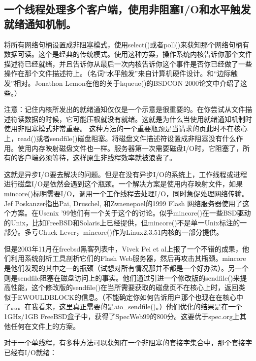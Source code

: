 \documentclass[12pt, twoside, a4paper, xetex]{report}
\begin{document}
\subsection*{一个线程处理多个客户端，使用非阻塞I/O和水平触发就绪通知机制。}

	将所有网络句柄设置成非阻塞模式，使用select()或者poll()来获知那个网络句柄有数据可读。这个是经典的传统模式。使用这种方案，操作系统内核告诉你那个文件描述符已经就绪，并且告诉你从最后一次内核告诉你这个事件是否你已经做了一些操作在那个文件描述符上。（名词“水平触发”来自计算机硬件设计。和“边际触发”相对。Jonathon Lemon在他的关于kqueue()的BSDCON 2000论文中介绍了这些。）
	
	注意：记住内核所发出的就绪通知仅仅是一个示意是很重要的。在你尝试从文件描述符读数据的时候，它可能压根就没有就绪。这就是为什么当使用就绪通知机制时使用非阻塞模式非常重要。
	这种方法的一个重要瓶颈是当请求的页此时不在核心上，read()或者sendfile()磁盘阻塞。将磁盘文件描述符设置成非阻塞没有什么作用。使用内存映射磁盘文件也一样。服务器第一次需要磁盘I/O时，它阻塞了，所有的客户端必须等待，这样原生非线程效率就被浪费了。
	
	这就是异步I/O要去解决的问题。但是在没有异步I/O的系统上，工作线程或进程进行磁盘I/O是依然会遇到这个瓶颈。一个解决方案是使用内存映射文件，如果mincore()标明需要I/O，调用一个工作线程去处理I/O，同时急促处理网络传输。Jef Poskanzer指出Pai, Druschel, 和Zwaenepoel的1999 Flash 网络服务器使用了这个方案。在Usenix '99他们有一个关于这个的讨论。似乎mincore()在一些BSD驱动的Unix，比如FreeBSD和Solaris上已经提供，但mincore()不是单一Unix标注的一部分。多亏Chuck Lever，mincore()作为Linux2.3.51内核的一部分提供。
	
	但是2003年11月在freebsd黑客列表中，Vivek Pei et al上报了一个不错的成果，他们利用系统剖析工具剖析它们的Flash Web服务器，然后再攻击其瓶颈。mincore是他们发现的其中之一的瓶颈（试想对所有情况那并不都是一个好办法）。另一个则是sendfile阻塞在磁盘访问上的事实。他们通过引进一个修改版的sendfile()来提高性能，这个修改版的sendfile()在当所需要获取的磁盘页不在核心上时，返回类似于EWOULDBLOCK的信息。（不能确定你如何告诉用户那个也现在在核心中了。。。在我看来，这里真正需要的是aio\_sendfile()。）他们优化的结果是在一个1GHz/1GB FreeBSD盒子中，获得了SpecWeb99的800分。这要优于spec.org上其他任何在文件上的方案。

对于一个单线程，有多种方法可以获知在一个非阻塞的套接字集合中，那个套接字已经有I/O就绪：
\end{document}
